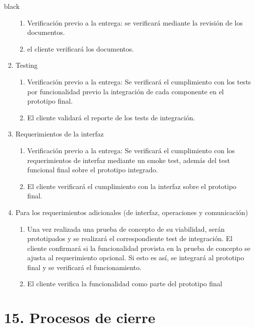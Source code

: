 \documentclass[
11pt, %
codirector, %
]{charter}
\begin{document}
\begin{consigna}{black}
\begin{enumerate}
		\begin{enumerate}				
			\item Verificación previo a la entrega: se verificará mediante la revisión de los documentos.			
			\item el cliente verificará los documentos.			
		\end{enumerate}			
		\item Testing
		\begin{enumerate}				
			\item Verificación previo a la entrega: Se verificará el cumplimiento con los tests por funcionalidad previo la integración de cada componente en el prototipo final. 
			\item El cliente validará el reporte de los tests de integración.
		\end{enumerate}			
		\item Requerimientos de la interfaz		
		\begin{enumerate}			
			\item Verificación previo a la entrega: Se verificará el cumplimiento con los requerimientos de interfaz mediante un smoke test, además del test funcional final sobre el prototipo integrado.			
			\item El cliente verificará el cumplimiento con la interfaz sobre el prototipo final.		
		\end{enumerate}	
		\item Para los requerimientos adicionales (de interfaz, operaciones y comunicación)
		\begin{enumerate}			
			\item Una vez realizada una prueba de concepto de su viabilidad, serán prototipados y se realizará el correspondiente test de integración. El cliente confirmará si la funcionalidad provista en la prueba de concepto se ajusta al requerimiento opcional. Si esto es así, se integrará al prototipo final y se verificará el funcionamiento.
			\item El cliente verifica la funcionalidad como parte del prototipo final
	\end{enumerate}
\end{enumerate}


\end{consigna}

\section{15. Procesos de cierre}   
\label{sec:cierre}
\end{document}
